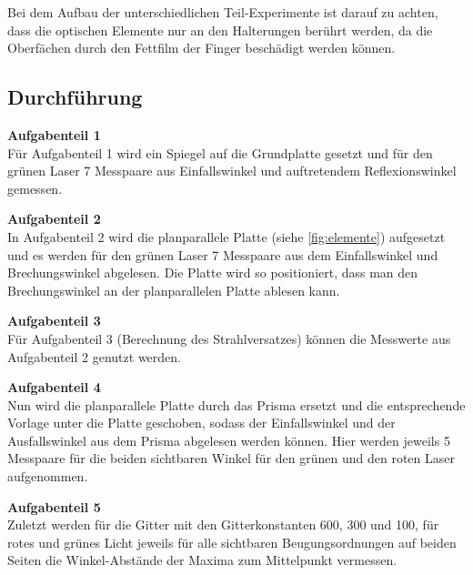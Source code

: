         \noindent
        Bei dem Aufbau der unterschiedlichen Teil-Experimente ist darauf zu achten, dass die optischen Elemente nur an den Halterungen berührt werden, 
        da die Oberfächen durch den Fettfilm der Finger beschädigt werden können.

    \subsection{Durchführung}

        \textbf{Aufgabenteil 1}\\

            
        \noindent
            Für Aufgabenteil 1 wird ein Spiegel auf die Grundplatte gesetzt und für den grünen Laser 7 Messpaare aus Einfallswinkel und auftretendem Reflexionswinkel gemessen.
            \newline
            
            \noindent
            \textbf{Aufgabenteil 2}\\
            
            \noindent In Aufgabenteil 2 wird die planparallele Platte (siehe \autoref{fig:elemente}) aufgesetzt und es werden für den grünen Laser 7 Messpaare aus dem 
            Einfallswinkel und Brechungswinkel abgelesen. Die Platte wird so positioniert, dass man den Brechungswinkel an der planparallelen Platte ablesen kann.
            \newline
            
            \noindent
            \textbf{Aufgabenteil 3}\\

            \noindent Für Aufgabenteil 3 (Berechnung des Strahlversatzes) können die Messwerte aus Aufgabenteil 2 genutzt werden. 
            \newline
            
            \noindent
            \textbf{Aufgabenteil 4}\\

            \noindent Nun wird die planparallele Platte durch das Prisma ersetzt und die entsprechende Vorlage unter die Platte geschoben, sodass der 
            Einfallswinkel und der Ausfallswinkel aus dem Prisma abgelesen werden können. Hier werden jeweils 5 Messpaare für die beiden sichtbaren Winkel für den 
            grünen und den roten Laser aufgenommen.
            \newline
            
            \noindent
            \textbf{Aufgabenteil 5}\\

            \noindent Zuletzt werden für die Gitter mit den Gitterkonstanten 600, 300 und 100,  für rotes und grünes Licht jeweils für alle sichtbaren Beugungsordnungen auf beiden Seiten die Winkel-Abstände der Maxima zum 
            Mittelpunkt vermessen.\\